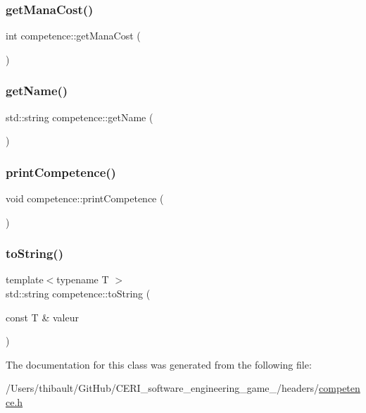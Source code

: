 \mbox{\label{classcompetence_a8346c6ae95df148e42f26b9a94655c8f}} 
\subsubsection{\texorpdfstring{get\+Mana\+Cost()}{getManaCost()}}
{\footnotesize\ttfamily int competence\+::get\+Mana\+Cost (\begin{DoxyParamCaption}{ }\end{DoxyParamCaption})}

\mbox{\label{classcompetence_abbb996751e239fc151caae2a73947710}} 
\subsubsection{\texorpdfstring{get\+Name()}{getName()}}
{\footnotesize\ttfamily std\+::string competence\+::get\+Name (\begin{DoxyParamCaption}{ }\end{DoxyParamCaption})}

\mbox{\label{classcompetence_a5e486c7db01680742633e93c42a638b3}} 
\subsubsection{\texorpdfstring{print\+Competence()}{printCompetence()}}
{\footnotesize\ttfamily void competence\+::print\+Competence (\begin{DoxyParamCaption}{ }\end{DoxyParamCaption})}

\mbox{\label{classcompetence_adbd67d184b75c46bc22c1aef070d9246}} 
\subsubsection{\texorpdfstring{to\+String()}{toString()}}
{\footnotesize\ttfamily template$<$typename T $>$ \\
std\+::string competence\+::to\+String (\begin{DoxyParamCaption}\item[{const T \&}]{valeur }\end{DoxyParamCaption})}



The documentation for this class was generated from the following file\+:\begin{DoxyCompactItemize}
\item 
/\+Users/thibault/\+Git\+Hub/\+C\+E\+R\+I\+\_\+software\+\_\+engineering\+\_\+game\+\_/headers/\hyperlink{competence_8h}{competence.\+h}\end{DoxyCompactItemize}
